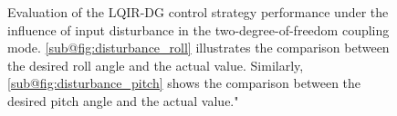 \documentclass[3p,times]{elsarticle}
\begin{document}
\begin{figure}[H]
	\centering
	\hfil
	\caption{Evaluation of the LQIR-DG control strategy performance under the influence of input disturbance in the two-degree-of-freedom coupling mode. \ref{sub@fig:disturbance_roll} illustrates the comparison between the desired roll angle and the actual value. Similarly, \ref{sub@fig:disturbance_pitch} shows the comparison between the desired pitch angle and the actual value."}
	\label{fig:disturbance}
\end{figure}
\end{document}
